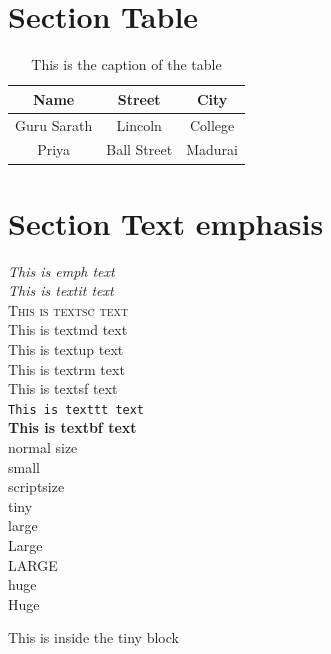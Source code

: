 \documentclass[a4paper,12pt]{book}
\begin{document}
\section{Section Table}
%
%
\begin{table}[ht]
	\centering
	\begin{tabular}{|c|c|c|} %
		\hline %
		\textbf{Name} & \textbf{Street} & \textbf{City}\\
		\hline
		Guru Sarath & Lincoln & College \\
		Priya & Ball Street & Madurai \\
		\hline
	\end{tabular}
	\caption{This is the caption of the table}
\end{table}

\section{Section Text emphasis}
%
%
\emph{This is emph text}\\
\textit{This is textit text}\\
\textsc{This is textsc text}\\
\textmd{This is textmd text}\\
\textup{This is textup text}\\
\textrm{This is textrm text}\\
\textsf{This is textsf text}\\
\texttt{This is texttt text}\\
\textbf{This is textbf text}\\

\normalsize{normal size}\\
\small{small}\\
\scriptsize{scriptsize}\\
\tiny{tiny}\\
\large{large}\\
\Large{Large}\\
\LARGE{LARGE}\\
\huge{huge}\\
\Huge{Huge}\\

\begin{tiny}
This is inside the tiny block
\end{tiny}
\end{document}
